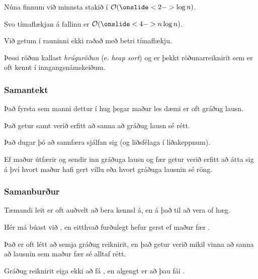 {
}

{
	{
		\item<1-> Núna finnum við minnsta stakið í $\mathcal{O}(\onslide<2->{\log n})$.
		\item<3-> Svo tímaflækjan á fallinu er $\mathcal{O}(\onslide<4->{n \log n})$.
		\item<5-> Við getum í rauninni ekki raðað með betri tímaflækju.
		\item<6-> Þessi röðun kallast \emph{hrúguröðun} (e. \emph{heap sort}) og er þekkt röðunarreiknirit sem er oft kennt í inngangsnámskeiðum.
	}
}

{
	\frametitle{Samantekt}
	{
		\item<1-> Það fyrsta sem manni dettur í hug þegar maður les dæmi er oft gráðug lausn.
		\item<2-> Það getur samt verið erfitt að sanna að gráðug lausn sé rétt.
		\item<3-> Það dugar þó að sannfæra sjálfan sig (og liðsfélaga í liðakeppnum).
		\item<4-> Ef maður útfærir og sendir inn gráðuga lausn og fær 
					getur verið erfitt að átta sig á því hvort maður hafi gert villu eða hvort gráðuga lausnin sé röng.
	}
}

{
	\frametitle{Samanburður}
	{
		\item<1-> Tæmandi leit er oft auðvelt að bera kennsl á, en á það til að vera of hæg. 
		\item<2-> Hér má búast við , en eitthvað furðulegt hefur gerst ef maður fær .
		\item<3-> Það er oft létt að semja gráðug reiknirit, en það getur verið mikil vinna að sanna að lausnin sem maður fær sé alltaf rétt.
		\item<4-> Gráðug reiknirit eiga ekki að fá , en algengt er að þau fái .
	}
}

{
}


